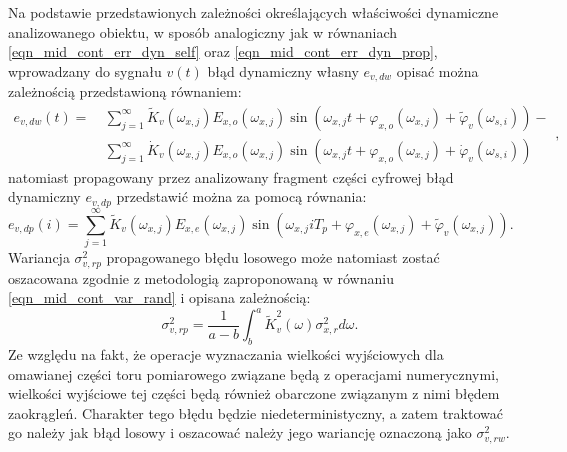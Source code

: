 Na podstawie przedstawionych zależności określających właściwości dynamiczne analizowanego obiektu, w sposób analogiczny jak w równaniach \eqref{eqn_mid_cont_err_dyn_self} oraz \eqref{eqn_mid_cont_err_dyn_prop}, wprowadzany do sygnału $v(t)$ błąd dynamiczny własny $e_{v,dw}$ opisać można zależnością przedstawioną równaniem:
\begin{equation}
\begin{split}
e_{v,dw} \left( t \right) = ~
& \sum _{j = 1} ^{\infty} \tilde{K}_{v} \left( \omega_{x,j} \right) E_{x,o} \left( \omega_{x,j} \right) \sin \left( \omega_{x,j} t + \varphi_{x,o} \left( \omega_{x,j} \right) + \tilde{\varphi}_{v} \left( \omega_{s,i} \right) \right) - \\
& \sum _{j = 1} ^{\infty} \dot{K}_{v} \left( \omega_{x,j} \right) E_{x,o} \left( \omega_{x,j} \right) \sin \left( \omega_{x,j} t + \varphi_{x,o} \left( \omega_{x,j} \right) + \dot{\varphi}_{v} \left( \omega_{s,i} \right) \right)
\end{split}
\label{eqn_mid_disc_err_dyn_self},
\end{equation}
natomiast propagowany przez analizowany fragment części cyfrowej błąd dynamiczny $e_{v,dp}$ przedstawić można za pomocą równania:
\begin{equation}
e_{v,dp} \left( i \right) = \sum _{j = 1} ^{\infty} \tilde{K}_{v} \left( \omega_{x,j} \right) E_{x,e} \left( \omega_{x,j} \right) \sin \left( \omega_{x,j} iT_{p} + \varphi_{x,e} \left( \omega_{x,j} \right) + \tilde{\varphi}_{v} \left( \omega_{x,j} \right) \right) \label{eqn_mid_disc_err_dyn_prop}.
\end{equation}
Wariancja $\sigma_{v,rp}^{2}$ propagowanego błędu losowego może natomiast zostać oszacowana zgodnie z metodologią zaproponowaną w równaniu \eqref{eqn_mid_cont_var_rand} i opisana zależnością:
\begin{equation}
\sigma_{v,rp}^{2} = \frac{1}{a - b} \int _{b} ^{a} \tilde{K}_{v}^{2} \left( \omega \right) \sigma_{x,r}^{2} d\omega  \label{eqn_mid_disc_var_rand}.
\end{equation}
Ze względu na fakt, że operacje wyznaczania wielkości wyjściowych dla omawianej części toru pomiarowego związane będą z operacjami numerycznymi, wielkości wyjściowe tej części będą również obarczone związanym z nimi błędem zaokrągleń. Charakter tego błędu będzie niedeterministyczny, a zatem traktować go należy jak błąd losowy i oszacować należy jego wariancję oznaczoną jako $\sigma_{v,rw}^{2}$.

